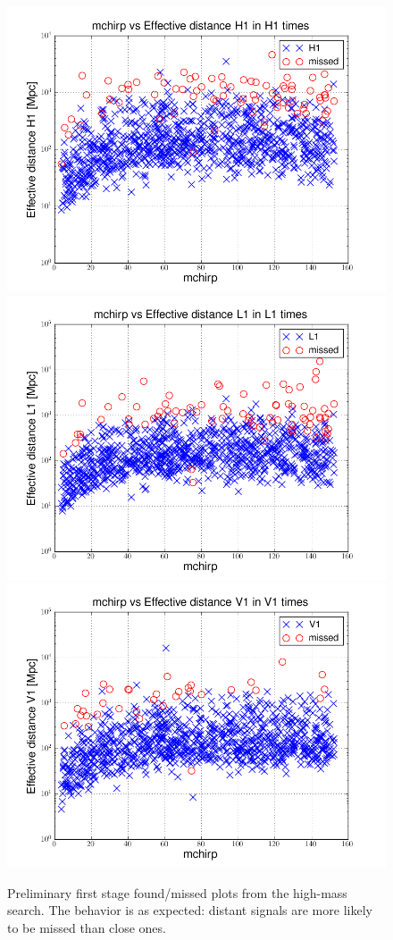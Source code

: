 \begin{figure}
  \includegraphics[width=0.5\linewidth]{figures/ninja2_results/H1-plotinspmissed_HIGH_FULL_DATA_mchirp-eff_dist-log-H1-871147552-5209912_first} 
  \includegraphics[width=0.5\linewidth]{figures/ninja2_results/L1-plotinspmissed_HIGH_FULL_DATA_mchirp-eff_dist-log-L1-871147552-5209912_first} \\
  \includegraphics[width=0.5\linewidth]{figures/ninja2_results/V1-plotinspmissed_HIGH_FULL_DATA_mchirp-eff_dist-log-V1-871147552-5209912_first} \\
  \caption[First stage found/missed plots from the high-mass search]{
  \label{f:ninja2_cbc_results_high_first}
Preliminary first stage found/missed plots from the high-mass search.
The behavior is as expected: distant signals are more likely to be
missed than close ones.
}
\end{figure}%

